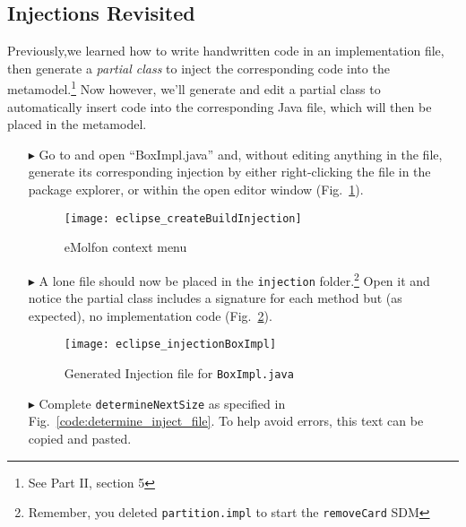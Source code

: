 \subsection{Injections Revisited}
\genHeader

Previously,we learned how to write handwritten code in an implementation file, then generate a \emph{partial class} to inject the corresponding code into the
metamodel.\footnote{See Part II, section 5} Now however, we'll generate and edit a partial class to automatically insert code into the corresponding Java file,
which will then be placed in the metamodel.

\begin{itemize}

\item[$\blacktriangleright$] Go to and open ``BoxImpl.java'' and, without editing anything in the file, generate its corresponding injection by
either right-clicking the file in the package explorer, or within the open editor window (Fig.~\ref{fig:createInjection}).

\vspace{0.5cm}

\begin{figure}[htbp]
    \centering
    \texttt{[image: eclipse\_createBuildInjection]}
    \caption{eMolfon context menu}
    \label{fig:createInjection}
\end{figure}

\clearpage

\item[$\blacktriangleright$] A lone file should now be placed in the \texttt{injection} folder.\footnote{Remember, you deleted \texttt{partition.impl} to start
the \texttt{removeCard} SDM} Open it and notice the partial class includes a signature for each method but (as expected), no implementation code
(Fig.~\ref{fig:injection_partialClassBox}).

\vspace{0.5cm}

\begin{figure}[htbp]
    \centering
    \texttt{[image: eclipse\_injectionBoxImpl]}
    \caption{Generated Injection file for \texttt{BoxImpl.java}}
    \label{fig:injection_partialClassBox}
\end{figure}

\vspace{0.5cm}

\item[$\blacktriangleright$] Complete \texttt{determineNextSize} as specified in Fig.~\ref{code:determine_inject_file}. To help avoid errors, this text can
be copied and pasted.


\end{itemize}
